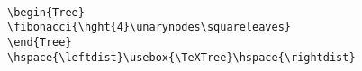                                                                    
\begin{Figure}                                                                  
\centering                                                                      
\begin{Tree}                                                                    
\end{Tree}

\hspace{\leftdist}\usebox{\TeXTree}\hspace{\rightdist}\                         
                                                                      
\begin{verbatim}                                                                
\begin{Tree}                                                                    
\fibonacci{\hght{4}\unarynodes\squareleaves}                                    
\end{Tree}
\hspace{\leftdist}\usebox{\TeXTree}\hspace{\rightdist}
\end{verbatim}
                                                                  
\caption{This is an example of a Fibonacci tree.}                                           
\end{Figure}                                                                    
 
                                                                                
\clearpage                                                                      
                                                            
                                                                  
                                                                                
                                                                                

